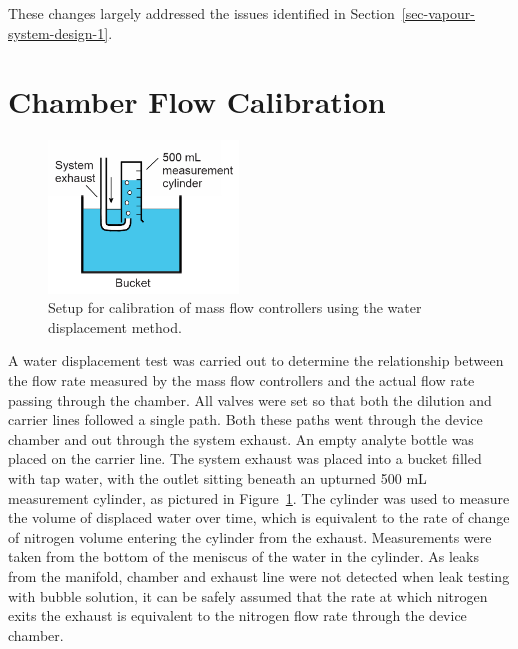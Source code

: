\documentclass[
  a4paper,
]{scrbook}
\begin{document}
These changes largely addressed the issues identified in
Section~\ref{sec-vapour-system-design-1}.

\hypertarget{sec-calibration}{%
\section{Chamber Flow Calibration}\label{sec-calibration}}

\begin{figure}

{\centering \includegraphics[width=0.45\textwidth,height=\textheight]{figures/ch8/water_displacement.png}

}

\caption[Setup for calibration of mass flow controllers using the water
displacement method.]{\label{fig-water-displacement}Setup for
calibration of mass flow controllers using the water displacement
method.}

\end{figure}

A water displacement test was carried out to determine the relationship
between the flow rate measured by the mass flow controllers and the
actual flow rate passing through the chamber. All valves were set so
that both the dilution and carrier lines followed a single path. Both
these paths went through the device chamber and out through the system
exhaust. An empty analyte bottle was placed on the carrier line. The
system exhaust was placed into a bucket filled with tap water, with the
outlet sitting beneath an upturned 500 mL measurement cylinder, as
pictured in Figure~\ref{fig-water-displacement}. The cylinder was used
to measure the volume of displaced water over time, which is equivalent
to the rate of change of nitrogen volume entering the cylinder from the
exhaust. Measurements were taken from the bottom of the meniscus of the
water in the cylinder. As leaks from the manifold, chamber and exhaust
line were not detected when leak testing with bubble solution, it can be
safely assumed that the rate at which nitrogen exits the exhaust is
equivalent to the nitrogen flow rate through the device chamber.
\end{document}
